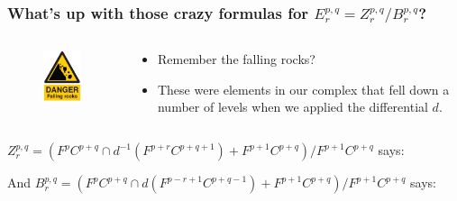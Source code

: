 \documentclass[notheorems]{beamer}
\theoremstyle{plain}
\theoremstyle{definition}
\theoremstyle{darkredexample}
\theoremstyle{remark}
\begin{document}
\begin{frame}
    \frametitle{What's up with those crazy formulas for $E_{r}^{p,q}=Z_{r}^{p,q}/B_{r}^{p,q}$?}
    \begin{columns}
	\begin{column}{0.4\textwidth}
	    \begin{figure}[htp]
		\centering
		\includegraphics[scale=1.2]{pictures/fallingrocks}
	    \end{figure}
	\end{column}
	\pause
	\begin{column}{0.8\textwidth}
	    \begin{itemize}
		\item Remember the falling rocks?
		    \pause
		\item These were elements in our complex that fell down a number of levels when we applied the differential $d$.
	    \end{itemize}
	\end{column}
    \end{columns}
    \pause
    
    \vspace{1cm}
    $Z_{r}^{p,q}=(F^{p}C^{p+q}\cap d^{-1}(F^{p+r}C^{p+q+1})+F^{p+1}C^{p+q})/F^{p+1}C^{p+q}$ says:
    \pause

    \begin{center}
    \end{center}
    \pause

    And $B_{r}^{p,q}=(F^{p}C^{p+q}\cap d(F^{p-r+1}C^{p+q-1})+F^{p+1}C^{p+q})/F^{p+1}C^{p+q}$ says:
    \pause

    \begin{center}
    \end{center}
\end{frame}
\end{document}
